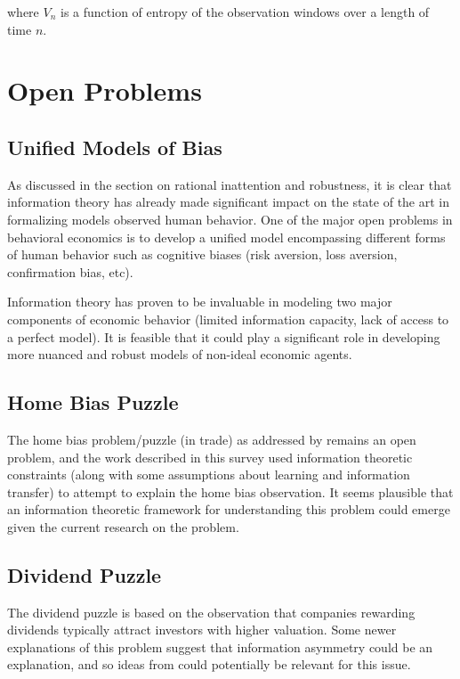 \documentclass[10pt, twocolumn]{IEEEtran}
\begin{document}
where $V_{n}$ is a function of entropy of the observation windows over a length of time $n$.

\section{Open Problems}

\subsection{Unified Models of Bias}
As discussed in the section on rational inattention and robustness, it is clear that
information theory has already made significant impact on the state of the art in
formalizing models observed human behavior. One of the major open problems in
behavioral economics is to develop a unified model encompassing different forms
of human behavior such as cognitive biases (risk aversion, loss aversion,
confirmation bias, etc).

Information theory has proven to be invaluable in modeling two major components of
economic behavior (limited information capacity, lack of access to a perfect model).
It is feasible that it could play a significant role in developing more nuanced and
robust models of non-ideal economic agents.
\subsection{Home Bias Puzzle}
The home bias problem/puzzle (in trade) as addressed by \cite{homeBias} remains an open problem, and
the work described in this survey used information theoretic constraints
(along with some assumptions about learning and information transfer) to attempt
to explain the home bias observation. It seems plausible that an information
theoretic framework for understanding this problem could emerge given the current
research on the problem.
\subsection{Dividend Puzzle}
The dividend puzzle is based on the observation that companies rewarding dividends
typically attract investors with higher valuation. Some newer explanations of this
problem suggest that information asymmetry could be an explanation, and so
ideas from \cite{homeBias} could potentially be relevant for this issue.


\end{document}
